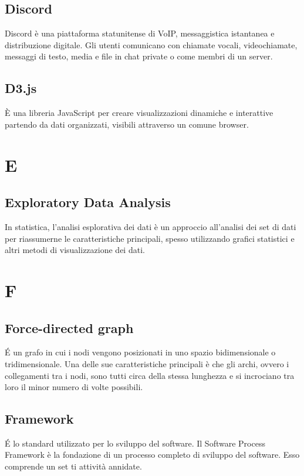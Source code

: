 \subsection{Discord}
Discord è una piattaforma statunitense di VoIP, messaggistica istantanea e distribuzione digitale. Gli utenti comunicano con chiamate vocali, videochiamate, messaggi di testo, media e file in chat private o come membri di un server.

\subsection{D3.js}
\`E una libreria JavaScript per creare visualizzazioni dinamiche e interattive partendo da dati organizzati, visibili attraverso un comune browser.



\newpage
\section{E}
\subsection{Exploratory Data Analysis}
In statistica, l'analisi esplorativa dei dati è un approccio all'analisi dei set di dati per riassumerne le caratteristiche principali, spesso utilizzando grafici statistici e altri metodi di visualizzazione dei dati.

\newpage
\section{F}
\subsection{Force-directed graph}
\'E un grafo in cui i nodi vengono posizionati in uno spazio bidimensionale o tridimensionale. Una delle sue caratteristiche principali è che gli archi, ovvero i collegamenti tra i nodi, sono tutti circa della stessa lunghezza e si incrociano tra loro il minor numero di volte possibili.

\subsection{Framework}
\'E lo standard utilizzato per lo sviluppo del software. Il Software Process Framework è la fondazione di un processo completo di sviluppo
del software. Esso comprende un set ti attività annidate.

